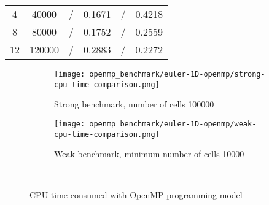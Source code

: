 \begin{table}[!ht]
\begin{subtable}[b]{0.80\textwidth}
{\begin{tabular}{cccccc}
      4                              & 40000                 & /             & 0.1671          & /                 & 0.4218              \\
      8                              & 80000                 & /             & 0.1752          & /                 & 0.2559              \\
      12                             & 120000                & /             & 0.2883          & /                 & 0.2272              \\
      \hline
    \end{tabular}}
  \end{subtable}
\end{table}

\begin{figure}[!ht]
  \centering
  \begin{subfigure}[b]{0.45\textwidth}
    \centering
    \texttt{[image: openmp\_benchmark/euler-1D-openmp/strong-cpu-time-comparison.png]}
    \caption{Strong benchmark, number of cells 100000}\label{fig:strong-cpu-time-openmp}
  \end{subfigure}\quad%
  \begin{subfigure}[b]{0.45\textwidth}
    \centering
    \texttt{[image: openmp\_benchmark/euler-1D-openmp/weak-cpu-time-comparison.png]}
    \caption{Weak benchmark, minimum number of cells 10000}\label{fig:weak-cpu-time-openmp}
  \end{subfigure}\\
  \caption{CPU time consumed with OpenMP programming model}\label{fig:cpu-time-openmp}
\end{figure}

